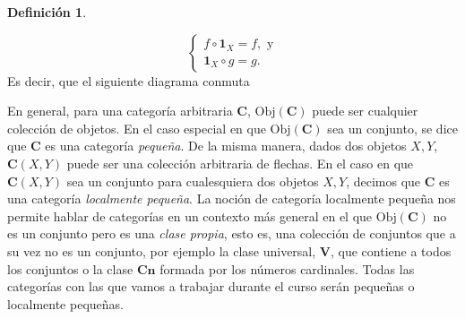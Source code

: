 \documentclass[12pt,a4paper]{book}
\theoremstyle{definition} \newtheorem{defn}[thm]{Definición}
\theoremstyle{definition} \newtheorem{ejemplo}[thm]{Ejemplo}
\theoremstyle{definition} \newtheorem{ejercicio}[thm]{Ejercicio}
\theoremstyle{remark} \newtheorem*{obs}{Observación}
\def\id{\mathbf{1}}
\def\obj{\mathrm{Obj}}
\def\cat{\mathbf{C}}
\begin{document}
\begin{defn}
\begin{enumerate}
\begin{enumerate}
\begin{equation*}
       \begin{cases}
	 f\circ \id_X=f, \text{ y} \\
	 \id_X\circ g=g.
       \end{cases}
     \end{equation*}
     Es decir, que el siguiente diagrama conmuta
     \begin{center}
       \end{center}
 \end{enumerate}
  \end{enumerate}
\end{defn}
En general, para una categoría arbitraria $\cat$, $\obj(\cat)$ puede ser cualquier colección de objetos. En el caso especial en que $\obj(\cat)$ sea un conjunto, se dice que $\cat$ es una categoría \emph{pequeña}. De la misma manera, dados dos objetos $X,Y$, $\cat(X,Y)$ puede ser una colección arbitraria de flechas. En el caso en que $\cat(X,Y)$ sea un conjunto para cualesquiera dos objetos $X,Y$, decimos que $\cat$ es una categoría \emph{localmente pequeña}. La noción de categoría localmente pequeña nos permite hablar de categorías en un contexto más general en el que $\obj(\cat)$ no es un conjunto pero es una \emph{clase propia}, esto es, una colección de conjuntos que a su vez no es un conjunto, por ejemplo la clase universal, $\mathbf{V}$, que contiene a todos los conjuntos o la clase $\mathbf{Cn}$ formada por los números cardinales. Todas las categorías con las que vamos a trabajar durante el curso serán pequeñas o localmente pequeñas. 
\end{document}
